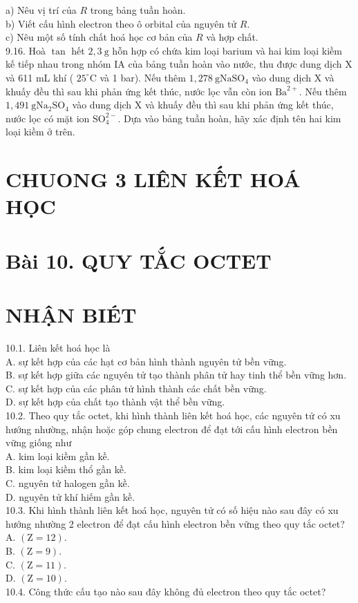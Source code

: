\documentclass[10pt]{article}
\begin{document}
a) Nêu vị trí của $R$ trong bảng tuần hoàn.\\
b) Viết cấu hình electron theo ô orbital của nguyên tử $R$.\\
c) Nêu một số tính chất hoá học cơ bản của $R$ và hợp chất.\\
9.16. Hoà $\tan$ hết $2,3 \mathrm{~g}$ hỗn hợp có chứa kim loại barium và hai kim loại kiềm kế tiếp nhau trong nhóm IA của bảng tuần hoàn vào nước, thu được dung dịch X và 611 mL khí ( $25^{\circ} \mathrm{C}$ và 1 bar). Nếu thêm $1,278 \mathrm{~g} \mathrm{Na} \mathrm{SO}_{4}$ vào dung dịch X và khuấy đều thì sau khi phản ứng kết thúc, nước lọc vẫn còn ion $\mathrm{Ba}^{2+}$. Nếu thêm $1,491 \mathrm{~g} \mathrm{Na}_{2} \mathrm{SO}_{4}$ vào dung dịch X và khuấy đều thì sau khi phản ứng kết thúc, nước lọc có mặt ion $\mathrm{SO}_{4}^{2-}$. Dựa vào bảng tuần hoàn, hãy xác định tên hai kim loại kiềm ở trên.

\section*{CHUONG 3 LIÊN KẾT HOÁ HỌC}
\section*{Bài 10. QUY TẮC OCTET}
\section*{NHẬN BIÉT}
10.1. Liên kết hoá học là\\
A. sự kết hợp của các hạt cơ bản hình thành nguyên tử bền vững.\\
B. sự kết hợp giữa các nguyên tử tạo thành phân tử hay tinh thể bền vững hơn.\\
C. sự kết hợp của các phân tử hình thành các chất bền vững.\\
D. sự kết hợp của chất tạo thành vật thể bền vững.\\
10.2. Theo quy tắc octet, khi hình thành liên kết hoá học, các nguyên tử có xu hướng nhường, nhận hoặc góp chung electron để đạt tới cấu hình electron bền vững giống như\\
A. kim loại kiềm gần kề.\\
B. kim loại kiềm thổ gần kề.\\
C. nguyên tử halogen gần kề.\\
D. nguyên tử khí hiếm gần kề.\\
10.3. Khi hình thành liên kết hoá học, nguyên tử có số hiệu nào sau đây có xu hướng nhường 2 electron để đạt cấu hình electron bền vững theo quy tắc octet?\\
A. $(\mathrm{Z}=12)$.\\
B. $(\mathrm{Z}=9)$.\\
C. $(\mathrm{Z}=11)$.\\
D. $(\mathrm{Z}=10)$.\\
10.4. Công thức cấu tạo nào sau đây không đủ electron theo quy tắc octet?
\end{document}

